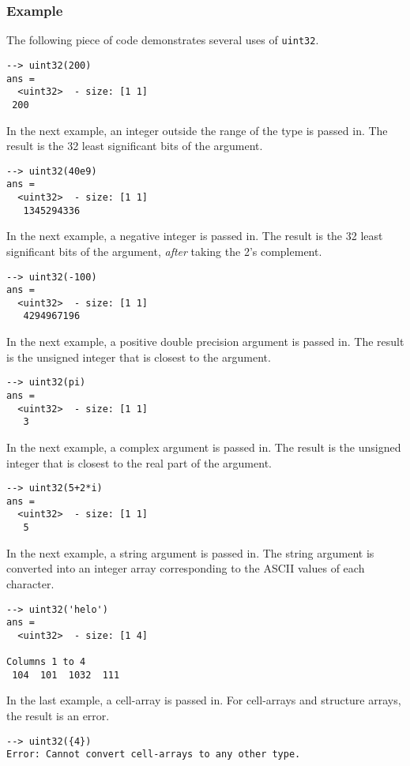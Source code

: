\subsubsection{Example}
The following piece of code demonstrates several uses of \verb|uint32|.
\begin{verbatim}
--> uint32(200)
ans =
  <uint32>  - size: [1 1]
 200
\end{verbatim}
In the next example, an integer outside the range  of the type is passed in.  The result is the 32 least significant bits of the argument.
\begin{verbatim}
--> uint32(40e9)
ans =
  <uint32>  - size: [1 1]
   1345294336
\end{verbatim}
In the next example, a negative integer is passed in.  The result is the 32 least significant bits of the argument, \emph{after} taking the 2's complement.
\begin{verbatim}
--> uint32(-100)
ans =
  <uint32>  - size: [1 1]
   4294967196
\end{verbatim}
In the next example, a positive double precision argument is passed in.  The result is the unsigned integer that is closest to the argument.
\begin{verbatim}
--> uint32(pi)
ans =
  <uint32>  - size: [1 1]
   3
\end{verbatim}
In the next example, a complex argument is passed in.  The result is the unsigned integer that is closest to the real part of the argument.
\begin{verbatim}
--> uint32(5+2*i)
ans =
  <uint32>  - size: [1 1]
   5
\end{verbatim}
In the next example, a string argument is passed in.  The string argument is converted into an integer array corresponding to the ASCII values of each character.
\begin{verbatim}
--> uint32('helo')
ans =
  <uint32>  - size: [1 4]
  
Columns 1 to 4
 104  101  1032  111
\end{verbatim}
In the last example, a cell-array is passed in.  For cell-arrays and structure arrays, the result is an error.
\begin{verbatim}
--> uint32({4})
Error: Cannot convert cell-arrays to any other type.
\end{verbatim}

